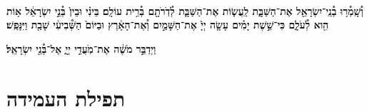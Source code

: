 \documentclass[twoside, openany, parskip=half, 11pt]{book}
\begin{document}
\\
\textbf{וְ֯שָֽׁמְ֯ר֥וּ בְ֯נֵֽי־יִשְׂרָאֵ֖ל אֶת־הַשַּׁבָּ֑ת
לַֽעֲשׂ֧וֹת אֶת־הַשַּׁבָּ֛ת לְ֯דֹֽרֹתָ֖ם בְּ֯רִ֥ית עוֹלָֽם׃ בֵּינִ֗י וּבֵין֙ בְּ֯נֵ֣י יִשְׂרָאֵ֔ל א֥וֹת הִ֖וא לְ֯עֹלָ֑ם כִּי־שֵׁ֣שֶׁת יָמִ֗ים עָשָׂ֤ה יְיָ֙
אֶת־הַשָּׁמַ֣יִם וְ֯אֶת־הָאָ֔רֶץ וּבַיּוֹם֙ הַשְּׁ֯בִיעִ֔י שָׁבַ֖ת וַיִּנָּפַֽשׁ׃
}

\textbf{
וַיְדַבֵּ֣ר מֹשֶׁ֔ה אֶת־מֹֽעֲדֵ֖י יְיָ֑ אֶל־בְּ֯נֵ֖י יִשְׂרָאֵֽל׃
}



\halfkaddish

\section[תפילת העמידה]{ תפילת העמידה }

\newcommand{\shabbosshuva}{בשבת שובה׃}


\newcommand{\shabboskiddushhashem}{
\firstword{אַתָּה קָדוֹשׁ}
וְ֯שִׁמְךָ קָדוֹשׁ וּקְדוֹשִׁים בְּ֯כׇל־יוֹם יְ֯הַלְ֯לוּךָ סֶּֽלָה׃ בָּרוּךְ אַתָּה יְיָ *הָאֵל
(*\instruction{בשבת שובה:}
הַמֶּֽלֶךְ)
הַקָּדוֹשׁ׃
}


\newcommand{\shabboskiddushhayom}[1]{{
\firstword{אֱלֹהֵינוּ}
וֵאלֹהֵי אֲבוֹתֵינוּ רְ֯צֵה בִמְנוּחָתֵנוּ קַדְּ֯שֵׁנוּ בְּ֯מִצְוֹתֶיךָ וְ֯תֵן חֶלְקֵנוּ בְּ֯תוֹרָתֶךָ שַׂבְּ֯עֵנוּ מִטּוּבֶךָ וְ֯שַׂמְּ֯חֵנוּ בִּישׁוּעָתֶךָ וְ֯טַהֵר לִבֵּנוּ לְ֯עׇבְדְּ֯ךָ בֶּאֱמֶת׃ וְ֯הַנְחִילֵנוּ יְיָ אֱלֹהֵינוּ בְּ֯אַהֲבָה וּבְרָצוֹן שַׁבַּת קׇדְשֶׁךָ וְ֯יָנוּחוּ בָהּ#1 יִשְׂרָאֵל מְ֯קַדְּשֵׁי שְׁמֶךָ׃
בָּרוּךְ אַתָּה יְיָ מְ֯קַדֵּשׁ הַשַּׁבָּת׃
}}
\end{document}
